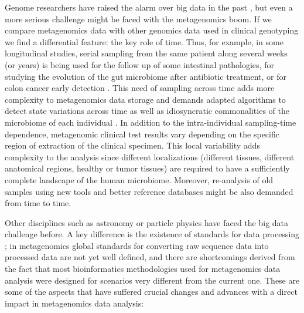 \documentclass[fleqn,10pt,lineno]{wlpeerj}
\begin{document}
Genome researchers have raised the alarm over big data in the past
\citep{hayden2015genome}, but even a more serious challenge might be
faced with the metagenomics boom. If we compare metagenomics data with
other genomics data used in clinical genotyping we find a differential
feature: the key role of time. Thus, for example, in some longitudinal
studies, serial sampling from the same patient
\citep{faust2015metagenomics} along several weeks (or years) is being
used for the follow up of some intestinal pathologies, for studying the
evolution of the gut microbiome after antibiotic treatment, or for colon
cancer early detection \citep{zeller2014potential}
\citep{garrett2015cancer}. This need of sampling across time adds more
complexity to metagenomics data storage and demands adapted algorithms
to detect state variations across time as well as idiosyncratic
commonalities of the microbiome of each individual
\citep{franzosa2015identifying}. In addition to the intra-individual
sampling-time dependence, metagenomic clinical test results vary
depending on the specific region of extraction of the clinical specimen.
This local variability adds complexity to the analysis since different
localizations (different tissues, different anatomical regions, healthy
or tumor tissues) are required to have a sufficiently complete landscape
of the human microbiome. Moreover, re-analysis of old samples using new
tools and better reference databases might be also demanded from time to
time.

Other disciplines such as astronomy or particle physics have faced the
big data challenge before. A key difference is the existence of
standards for data processing \citep{stephens2015big}; in metagenomics
global standards for converting raw sequence data into processed data
are not yet well defined, and there are shortcomings derived from the
fact that most bioinformatics methodologies used for metagenomics data
analysis were designed for scenarios very different from the current
one. These are some of the aspects that have suffered crucial changes
and advances with a direct impact in metagenomics data analysis:
\end{document}
